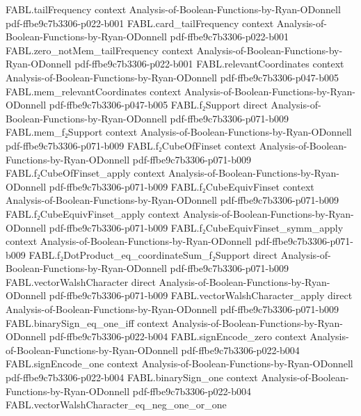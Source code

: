 \begin{theorem}
\proofstep
  {FABL.tailFrequency}
  {context}
  {Analysis-of-Boolean-Functions-by-Ryan-ODonnell}
  {pdf-ffbe9c7b3306-p022-b001}
\proofstep
  {FABL.card_tailFrequency}
  {context}
  {Analysis-of-Boolean-Functions-by-Ryan-ODonnell}
  {pdf-ffbe9c7b3306-p022-b001}
\proofstep
  {FABL.zero_notMem_tailFrequency}
  {context}
  {Analysis-of-Boolean-Functions-by-Ryan-ODonnell}
  {pdf-ffbe9c7b3306-p022-b001}
\proofstep
  {FABL.relevantCoordinates}
  {context}
  {Analysis-of-Boolean-Functions-by-Ryan-ODonnell}
  {pdf-ffbe9c7b3306-p047-b005}
\proofstep
  {FABL.mem_relevantCoordinates}
  {context}
  {Analysis-of-Boolean-Functions-by-Ryan-ODonnell}
  {pdf-ffbe9c7b3306-p047-b005}
\proofstep
  {FABL.f₂Support}
  {direct}
  {Analysis-of-Boolean-Functions-by-Ryan-ODonnell}
  {pdf-ffbe9c7b3306-p071-b009}
\proofstep
  {FABL.mem_f₂Support}
  {context}
  {Analysis-of-Boolean-Functions-by-Ryan-ODonnell}
  {pdf-ffbe9c7b3306-p071-b009}
\proofstep
  {FABL.f₂CubeOfFinset}
  {context}
  {Analysis-of-Boolean-Functions-by-Ryan-ODonnell}
  {pdf-ffbe9c7b3306-p071-b009}
\proofstep
  {FABL.f₂CubeOfFinset_apply}
  {context}
  {Analysis-of-Boolean-Functions-by-Ryan-ODonnell}
  {pdf-ffbe9c7b3306-p071-b009}
\proofstep
  {FABL.f₂CubeEquivFinset}
  {context}
  {Analysis-of-Boolean-Functions-by-Ryan-ODonnell}
  {pdf-ffbe9c7b3306-p071-b009}
\proofstep
  {FABL.f₂CubeEquivFinset_apply}
  {context}
  {Analysis-of-Boolean-Functions-by-Ryan-ODonnell}
  {pdf-ffbe9c7b3306-p071-b009}
\proofstep
  {FABL.f₂CubeEquivFinset_symm_apply}
  {context}
  {Analysis-of-Boolean-Functions-by-Ryan-ODonnell}
  {pdf-ffbe9c7b3306-p071-b009}
\proofstep
  {FABL.f₂DotProduct_eq_coordinateSum_f₂Support}
  {direct}
  {Analysis-of-Boolean-Functions-by-Ryan-ODonnell}
  {pdf-ffbe9c7b3306-p071-b009}
\proofstep
  {FABL.vectorWalshCharacter}
  {direct}
  {Analysis-of-Boolean-Functions-by-Ryan-ODonnell}
  {pdf-ffbe9c7b3306-p071-b009}
\proofstep
  {FABL.vectorWalshCharacter_apply}
  {direct}
  {Analysis-of-Boolean-Functions-by-Ryan-ODonnell}
  {pdf-ffbe9c7b3306-p071-b009}
\proofstep
  {FABL.binarySign_eq_one_iff}
  {context}
  {Analysis-of-Boolean-Functions-by-Ryan-ODonnell}
  {pdf-ffbe9c7b3306-p022-b004}
\proofstep
  {FABL.signEncode_zero}
  {context}
  {Analysis-of-Boolean-Functions-by-Ryan-ODonnell}
  {pdf-ffbe9c7b3306-p022-b004}
\proofstep
  {FABL.signEncode_one}
  {context}
  {Analysis-of-Boolean-Functions-by-Ryan-ODonnell}
  {pdf-ffbe9c7b3306-p022-b004}
\proofstep
  {FABL.binarySign_one}
  {context}
  {Analysis-of-Boolean-Functions-by-Ryan-ODonnell}
  {pdf-ffbe9c7b3306-p022-b004}
\proofstep
  {FABL.vectorWalshCharacter_eq_neg_one_or_one}

\end{theorem}
